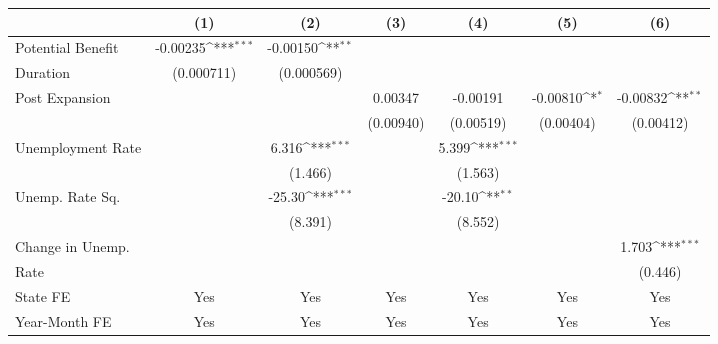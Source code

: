 {
\def\sym#1{\ifmmode^{#1}\else\(^{#1}\)\fi}
\begin{tabular}{l*{6}{c}}
\hline\hline
                    &\multicolumn{1}{c}{(1)}         &\multicolumn{1}{c}{(2)}         &\multicolumn{1}{c}{(3)}         &\multicolumn{1}{c}{(4)}         &\multicolumn{1}{c}{(5)}         &\multicolumn{1}{c}{(6)}         \\
\hline
Potential Benefit   &    -0.00235\sym{***}&    -0.00150\sym{**} &                     &                     &                     &                     \\
Duration            &  (0.000711)         &  (0.000569)         &                     &                     &                     &                     \\
[1em]
Post Expansion      &                     &                     &     0.00347         &    -0.00191         &    -0.00810\sym{*}  &    -0.00832\sym{**} \\
                    &                     &                     &   (0.00940)         &   (0.00519)         &   (0.00404)         &   (0.00412)         \\
[1em]
Unemployment Rate   &                     &       6.316\sym{***}&                     &       5.399\sym{***}&                     &                     \\
                    &                     &     (1.466)         &                     &     (1.563)         &                     &                     \\
[1em]
Unemp. Rate Sq.     &                     &      -25.30\sym{***}&                     &      -20.10\sym{**} &                     &                     \\
                    &                     &     (8.391)         &                     &     (8.552)         &                     &                     \\
[1em]
Change in Unemp.    &                     &                     &                     &                     &                     &       1.703\sym{***}\\
Rate                &                     &                     &                     &                     &                     &     (0.446)         \\
\hline
State FE            &         Yes         &         Yes         &         Yes         &         Yes         &         Yes         &         Yes         \\
Year-Month FE       &         Yes         &         Yes         &         Yes         &         Yes         &         Yes         &         Yes         \\

\end{tabular}}
